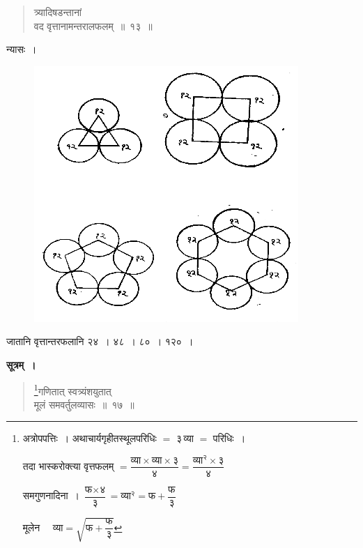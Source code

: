 \documentclass[11pt, openany]{book}
\begin{document}
\newpage
\begin{quote}
    \bqt 
त्र्यादिषडन्तानां \\
वद वृत्तानामन्तरालफलम्~॥~१३~॥
\end{quote}

 न्यासः~। 
 \vspace{-2mm}
 
\begin{figure}[h!]
    \centering
    \includegraphics[scale=0.65]{graphics/capture20.png}
    \captionsetup{labelformat=empty}
\end{figure}
 \vspace{-2mm}

जातानि वृत्तान्तरफलानि २४~। ४८~। ८०~। १२०~।
\newpage

 \textbf{सूत्रम्~।} 
\setcounter{footnote}{0}
\begin{quote}
    \bs 
     \footnote{अत्रोपपत्तिः~। अथाचार्यगृहीतस्थूलपरिधिः $=$ ३\,व्या $=$ परिधिः~। 
\vspace{1mm}

\hspace{4mm} तदा भास्करोक्त्या वृत्तफलम् $= \dfrac{\mbox{व्या} \times \mbox{व्या} \times \mbox{३}}{\mbox{४}} =
\dfrac{\mbox{व्या}^{\text{२}} \times \mbox{३}}{\mbox{४}} $
\vspace{2mm}

\hspace{4mm} समगुणनादिना~। 
$\dfrac{\mbox{फ} \times \mbox{४}}{\mbox{३}} = \mbox{व्या}^{\text{२}} = \mbox{फ} + \dfrac{\mbox{फ}}{\mbox{३}}$ 
\vspace{2mm}

\hspace{4mm} मूलेन~~ $\mbox{व्या} = \sqrt{\mbox{फ} + \dfrac{\mbox{फ}}{\mbox{३}}}$}गणितात् स्वत्र्यंशयुतात् \\
मूलं समवर्तुलव्यासः~॥~१७~॥
\end{quote}
\end{document}
